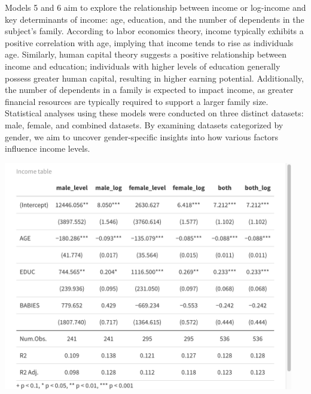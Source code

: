 \documentclass{article}[13pt]
\begin{document}
\begin{enumerate}
\qquad Models 5 and 6 aim to explore the relationship between income or log-income 
and key determinants of income: age, education, and the number of dependents in the subject's 
family. According to labor economics theory, income typically exhibits a positive correlation with 
age, implying that income tends to rise as individuals age. Similarly, human capital theory suggests 
a positive relationship between income and education; individuals with higher levels of education generally 
possess greater human capital, resulting in higher earning potential. Additionally, the number of dependents 
in a family is expected to impact income, as greater financial resources are typically required to support a larger family size.
Statistical analyses using these models were conducted on three distinct datasets: male, female, and combined datasets. By examining datasets categorized by gender, we aim to uncover gender-specific insights into how various factors influence income levels.

\includegraphics[width=0.95\textwidth]{income_table_big.png}
\newline


\end{enumerate}
\end{document}
